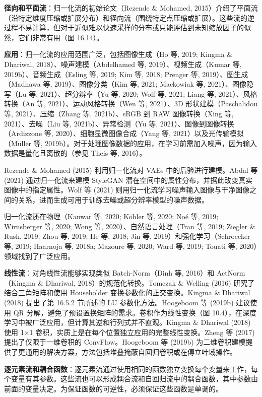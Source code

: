 \documentclass[lang=cn,newtx,10pt,scheme=chinese]{elegantbook}
\begin{document}
\textbf{径向和平面流}：归一化流的初始论文（Rezende \& Mohamed, 2015）介绍了平面流（沿特定维度压缩或扩展分布）和径向流（围绕特定点压缩或扩展）。这些流的逆过程不易计算，但对于近似难以快速采样的分布或只能评估到未知缩放因子的似然，它们非常有用（图 16.14）。

\textbf{应用}：归一化流的应用范围广泛，包括图像生成（Ho 等, 2019; Kingma \& Dhariwal, 2018）、噪声建模（Abdelhamed 等, 2019）、视频生成（Kumar 等, 2019b）、音频生成（Esling 等, 2019; Kim 等, 2018; Prenger 等, 2019）、图生成（Madhawa 等, 2019）、图像分类（Kim 等, 2021; Mackowiak 等, 2021）、图像隐写（Lu 等, 2021）、超分辨率（Yu 等, 2020; Wolf 等, 2021; Liang 等, 2021）、风格转换（An 等, 2021）、运动风格转换（Wen 等, 2021）、3D 形状建模（Paschalidou 等, 2021）、压缩（Zhang 等, 2021b）、sRGB 到 RAW 图像转换（Xing 等, 2021）、去噪（Liu 等, 2021b）、异常检测（Yu 等, 2021）、图像到图像转换（Ardizzone 等, 2020）、细胞显微图像合成（Yang 等, 2021）以及光传输模拟（Müller 等, 2019b）。对于处理图像数据的应用，在学习前需加入噪声，因为输入数据是量化且离散的（参见 Theis 等, 2016）。

Rezende \& Mohamed (2015) 利用归一化流对 VAEs 中的后验进行建模。Abdal 等 (2021) 通过归一化流来建模 StyleGAN 潜在空间中的属性分布，并据此改变真实图像中的指定属性。Wolf 等 (2021) 则用归一化流学习噪声输入图像与干净图像之间的关系，进而生成可用于训练去噪或超分辨率模型的噪声数据。

归一化流还在物理（Kanwar 等, 2020; Köhler 等, 2020; Noé 等, 2019; Wirnsberger 等, 2020; Wong 等, 2020）、自然语言处理（Tran 等, 2019; Ziegler \& Rush, 2019; Zhou 等, 2019; He 等, 2018; Jin 等, 2019）和强化学习（Schroecker 等, 2019; Haarnoja 等, 2018a; Mazoure 等, 2020; Ward 等, 2019; Touati 等, 2020）领域找到了广泛应用。

\textbf{线性流}：对角线性流能够实现类似 Batch-Norm（Dinh 等, 2016）和 ActNorm（Kingma \& Dhariwal, 2018）的规范化转换。Tomczak \& Welling (2016) 研究了结合三角矩阵和使用 Householder 变换参数化的正交变换。Kingma \& Dhariwal (2018) 提出了第 16.5.2 节所述的 LU 参数化方法。Hoogeboom 等 (2019b) 建议使用 QR 分解，避免了预设置换矩阵的需求。卷积作为线性变换（图 10.4），在深度学习中被广泛应用，但计算其逆和行列式并不直观。Kingma \& Dhariwal (2018) 使用 1×1 卷积，实质上是在每个位置独立应用的完整线性变换。Zheng 等 (2017) 提出了仅限于一维卷积的 ConvFlow。Hoogeboom 等 (2019b) 为二维卷积建模提供了更通用的解决方案，方法包括堆叠掩蔽自回归卷积或在傅立叶域操作。

\textbf{逐元素流和耦合函数}：逐元素流通过使用相同的函数独立变换每个变量来工作，每个变量有其参数。这些流也可以形成耦合流和自回归流中的耦合函数，其中参数由前面的变量决定。为保证函数的可逆性，必须保证这些函数是单调的。
\end{document}
